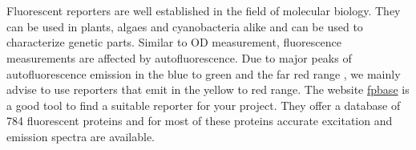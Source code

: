 \\ \\
Fluorescent reporters are well established in the field of molecular biology. They can be used in plants, algaes and cyanobacteria alike and can be used to characterize genetic parts. Similar to OD measurement, fluorescence measurements are affected by autofluorescence. Due to major peaks of autofluorescence emission in the blue to green \parencite{Rasala2013} and the far red range \parencite{Kavna2009}, we mainly advise to use reporters that emit in the yellow to red range.
The website \href{https://www.fpbase.org/}{fpbase} is a good tool to find a suitable reporter for your project. They offer a database of 784 fluorescent proteins and for most of these proteins accurate excitation and emission spectra are available.


\begin{table} [!htpb]
\centering
{}
\end{table}
